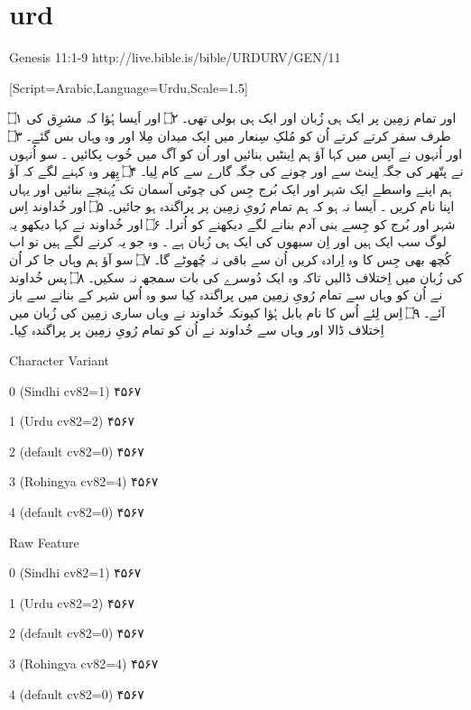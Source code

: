 \documentclass[12pt,fleqn,titlepage,twoside,a4paper]{book}
\begin{document}
\section{urd}

Genesis 11:1-9 http://live.bible.is/bible/URDURV/GEN/11

\begin{arab}[utf]

[Script=Arabic,Language=Urdu,Scale=1.5]


۝۱ اور تمام زمِین پر ایک ہی زُبان اور ایک ہی بولی تھی۔ ۝۲  اور اَیسا ہُؤا کہ مشرِق کی طرف سفر کرتے کرتے اُن کو مُلکِ سِنعار میں ایک میدان مِلا اور وہ وہاں بس گئے۔ ۝۳ اور اُنہوں نے آپس میں کہا آؤ ہم اِینٹیں بنائیں اور اُن کو آگ میں خُوب پکائیں ۔ سو اُنہوں نے پتّھر کی جگہ اِینٹ سے اور چونے کی جگہ گارے سے کام لِیا۔ ۝۴ پِھر وہ کہنے لگے کہ آؤ ہم اپنے واسطے ایک شہر اور ایک بُرج جِس کی چوٹی آسمان تک پُہنچے بنائیں اور یہاں اپنا نام کریں ۔ اَیسا نہ ہو کہ ہم تمام رُویِ زمِین پر پراگندہ ہو جائیں۔ ۝۵ اور خُداوند اِس شہر اور بُرج کو جِسے بنی آدم بنانے لگے دیکھنے کو اُترا۔ ۝۶ اور خُداوند نے کہا دیکھو یہ لوگ سب ایک ہیں اور اِن سبھوں کی ایک ہی زُبان ہے ۔ وہ جو یہ کرنے لگے ہیں تو اب کُچھ بھی جِس کا وہ اِرادہ کریں اُن سے باقی نہ چُھوٹے گا۔ ۝۷ سو آؤ ہم وہاں جا کر اُن کی زُبان میں اِختلاف ڈالیں تاکہ وہ ایک دُوسرے کی بات سمجھ نہ سکیں۔ ۝۸ پس خُداوند نے اُن کو وہاں سے تمام رُویِ زمِین میں پراگندہ کِیا سو وہ اُس شہر کے بنانے سے باز آئے۔ ۝۹ اِس لِئے اُس کا نام بابل ہُؤا کیونکہ خُداوند نے وہاں ساری زمِین کی زُبان میں اِختلاف ڈالا اور وہاں سے خُداوند نے اُن کو تمام رُویِ زمِین پر پراگندہ کِیا۔


Character Variant

 0 (Sindhi cv82=1)
۴۵۶۷

 1 (Urdu cv82=2)
۴۵۶۷

 2 (default cv82=0)
۴۵۶۷

 3 (Rohingya cv82=4)
۴۵۶۷

 4 (default cv82=0)
۴۵۶۷

Raw Feature

 0 (Sindhi cv82=1)
۴۵۶۷

 1 (Urdu cv82=2)
۴۵۶۷

 2 (default cv82=0)
۴۵۶۷

 3 (Rohingya cv82=4)
۴۵۶۷

 4 (default cv82=0)
۴۵۶۷

\end{arab}
\end{document}
